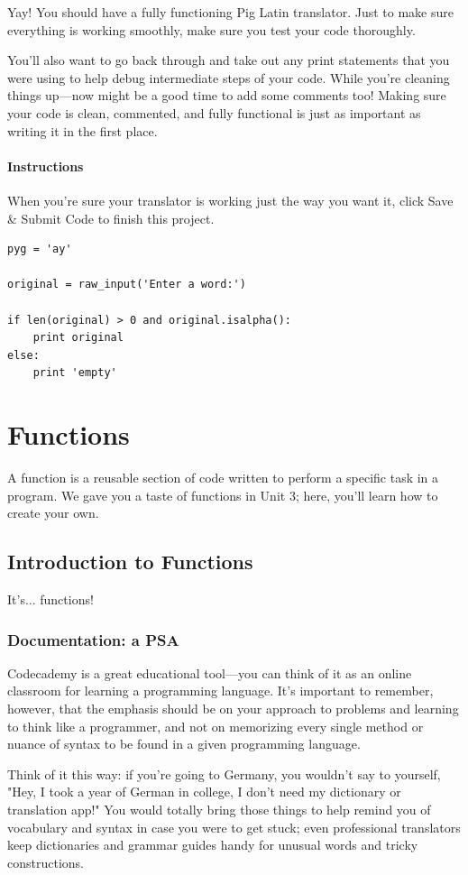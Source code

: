 \documentclass[12pt,a4paper,final,twoside,onecolumn,titlepage]{book}
\begin{document}
Yay! You should have a fully functioning Pig Latin translator. Just to make sure everything is working smoothly, make sure you test your code thoroughly.

You'll also want to go back through and take out any print statements that you were using to help debug intermediate steps of your code. While you're cleaning things up—now might be a good time to add some comments too! Making sure your code is clean, commented, and fully functional is just as important as writing it in the first place.

\subsubsection{Instructions}

When you're sure your translator is working just the way you want it, click Save \& Submit Code to finish this project.

\begin{lstlisting}
pyg = 'ay'

original = raw_input('Enter a word:')

if len(original) > 0 and original.isalpha():
    print original
else:
    print 'empty'
\end{lstlisting}

\chapter{Functions}
A function is a reusable section of code written to perform a specific task in a program. We gave you a taste of functions in Unit 3; here, you'll learn how to create your own.

\section{Introduction to Functions}
It's... functions!
\subsection{Documentation: a PSA}

Codecademy is a great educational tool—you can think of it as an online classroom for learning a programming language. It's important to remember, however, that the emphasis should be on your approach to problems and learning to think like a programmer, and not on memorizing every single method or nuance of syntax to be found in a given programming language.

Think of it this way: if you're going to Germany, you wouldn't say to yourself, "Hey, I took a year of German in college, I don't need my dictionary or translation app!" You would totally bring those things to help remind you of vocabulary and syntax in case you were to get stuck; even professional translators keep dictionaries and grammar guides handy for unusual words and tricky constructions.
\end{document}
